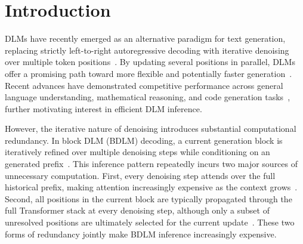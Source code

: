 \section{Introduction}

DLMs have recently emerged as an alternative paradigm for text generation, replacing strictly left-to-right autoregressive decoding with iterative denoising over multiple token positions~\citep{sahoo2024simple,nie2025neurips-large,ye2025dream}. By updating several positions in parallel, DLMs offer a promising path toward more flexible and potentially faster generation~\citep{wang2025diffusion}. Recent advances have demonstrated competitive performance across general language understanding, mathematical reasoning, and code generation tasks~\citep{nie2025llada20}, further motivating interest in efficient DLM inference. 

However, the iterative nature of denoising introduces substantial computational redundancy. In block DLM (BDLM) decoding, a current generation block is iteratively refined over multiple denoising steps while conditioning on an generated prefix~\citep{arriola2025iclr-block}. This inference pattern repeatedly incurs two major sources of unnecessary computation. First, every denoising step attends over the full historical prefix, making attention increasingly expensive as the context grows~\citep{long-etal-2026-focus}. Second, all positions in the current block are typically propagated through the full Transformer stack at every denoising step, although only a subset of unresolved positions are ultimately selected for the current update~\citep{liang2026focus}. These two forms of redundancy jointly make BDLM inference increasingly expensive.

